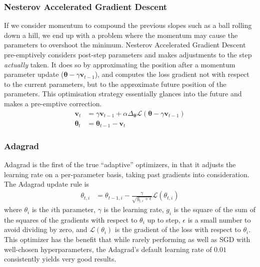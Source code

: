 \documentclass{report}
\begin{document}
	\subsubsection{Nesterov Accelerated Gradient Descent} \label{nesterov}
	If we consider momentum to compound the previous slopes such as a ball rolling down a hill, we end up with a problem where the momentum may cause the parameters to overshoot the minimum. Nesterov Accelerated Gradient Descent \parencite{nesterov} pre-emptively considers post-step parameters and makes adjustments to the step \textit{actually} taken. It does so by approximating the position after a momentum parameter update ($\bm{\theta} - \gamma\bm{v}_{t-1}$), and computes the loss gradient not with respect to the current parameters, but to the approximate future position of the parameters. This optimisation strategy essentially glances into the future and makes a pre-emptive correction.
	\begin{align}
		\bm{v}_t &= \gamma \bm{v}_{t-1} + \alpha \Delta_{\bm{\theta}} \mathcal{L}(\bm{\theta} - \gamma\bm{v}_{t-1}) \\
		\bm{\theta}_t &= \bm{\theta}_{t-1} - \bm{v}_t
	\end{align}
	
	\subsubsection{Adagrad}
	Adagrad \parencite{adagrad} is the first of the true ``adaptive'' optimizers, in that it adjusts the learning rate on a per-parameter basis, taking past gradients into consideration. The Adagrad update rule is
	\begin{align} \label{adagrad:1}
		\theta_{t, i} &= \theta_{t-1, i} - \frac{\gamma}{\sqrt{g_{t, i} + \epsilon}} \mathcal{L}(\theta_{t, i})
	\end{align}
	where $\theta_i$ is the $i$th parameter, $\gamma$ is the learning rate, $g_i$ is the square of the sum of the squares of the gradients with respect to $\theta_i$ up to step, $\epsilon$ is a small number to avoid dividing by zero, and $\mathcal{L}(\theta_i)$ is the gradient of the loss with respect to $\theta_i$. This optimizer has the benefit that while rarely performing as well as SGD with well-chosen hyperparameters, the Adagrad's default learning rate of $0.01$ consistently yields very good results.
	
\end{document}

